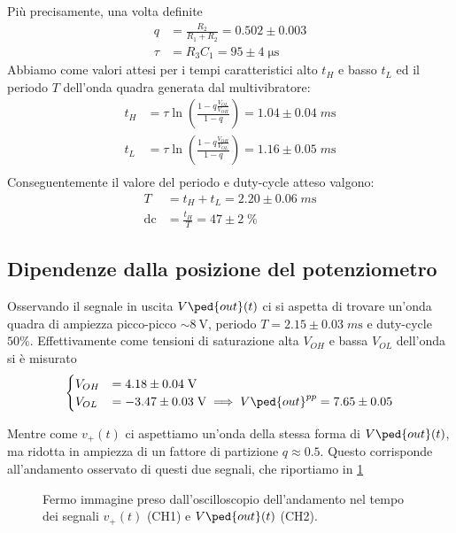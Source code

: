 \documentclass[10pt, a4paper, italian]{article}
\begin{document}
Più precisamente, una volta definite
\begin{align*}
q &= \frac{R_2}{R_1 + R_2} = 0.502 \pm 0.003 \\
\tau &= R_3 C_1 = 95 \pm 4 \; \si{\micro\s}
\end{align*}
Abbiamo come valori attesi per i tempi caratteristici alto $t_H$ e basso
$t_L$ ed il periodo $T$ dell'onda quadra generata dal multivibratore:
\begin{align}
t_H &= \tau \ln\left(\frac{1 - q\frac{V_{OL}}{V_{OH}}}{1-q}\right) =
1.04 \pm 0.04 \; \si{m\s} \\
t_L &= \tau \ln\left(\frac{1 - q\frac{V_{OH}}{V_{OL}}}{1-q}\right) =
1.16 \pm 0.05 \; \si{m\s} \\
\end{align}
Conseguentemente il valore del periodo e duty-cycle atteso valgono:
\begin{align}
T &= t_H + t_L = 2.20 \pm 0.06 \; \si{m\s} \\
\mathrm{dc} &= \frac{t_H}{T} = 47 \pm 2 \; \%
\end{align}

\subsection{Dipendenze dalla posizione del potenziometro}
Osservando il segnale in uscita $V\ped{out} (t)$ ci si aspetta di trovare
un'onda quadra di ampiezza picco-picco $\sim \SI{8}{\V}$, periodo
$T = 2.15 \pm 0.03 \; \si{m\s}$ e duty-cycle $50 \%$. Effettivamente come
tensioni di saturazione alta $V_{OH}$ e bassa $V_{OL}$ dell'onda si è misurato
\begin{align*}
\begin{cases}
V_{OH} &= 4.18 \pm 0.04 \; \si{\V} \\
V_{OL} &= -3.47 \pm 0.03 \; \si{\V}  \implies V\ped{out}^{pp} = 7.65 \pm 0.05
\end{cases}
\end{align*}

Mentre come $v_+ (t)$ ci aspettiamo un'onda della stessa forma di
$V\ped{out} (t)$, ma ridotta in ampiezza di un fattore di partizione
$q \approx 0.5$. Questo corrisponde all'andamento osservato di questi due
segnali, che riportiamo in \cref{fig: v+vout}
\begin{figure}[htbp]
	\centering
	\caption{Fermo immagine preso dall'oscilloscopio dell'andamento nel tempo dei
	segnali $v_+ (t)$ (CH1) e $V\ped{out} (t)$ (CH2). \label{fig: v+vout}}
\end{figure}
\end{document}
